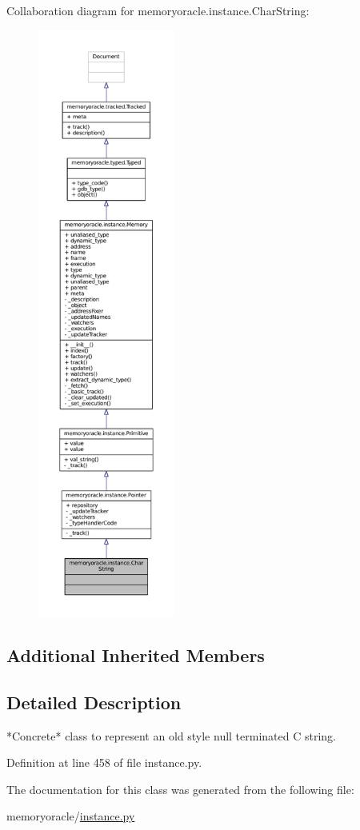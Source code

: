 Collaboration diagram for memoryoracle.\+instance.\+Char\+String\+:
\nopagebreak
\begin{figure}[H]
\begin{center}
\leavevmode
\includegraphics[height=550pt]{classmemoryoracle_1_1instance_1_1CharString__coll__graph}
\end{center}
\end{figure}
\subsection*{Additional Inherited Members}


\subsection{Detailed Description}
\begin{DoxyVerb}*Concrete* class to represent an old style null terminated C string.
\end{DoxyVerb}
 

Definition at line 458 of file instance.\+py.



The documentation for this class was generated from the following file\+:\begin{DoxyCompactItemize}
\item 
memoryoracle/\hyperlink{instance_8py}{instance.\+py}\end{DoxyCompactItemize}
